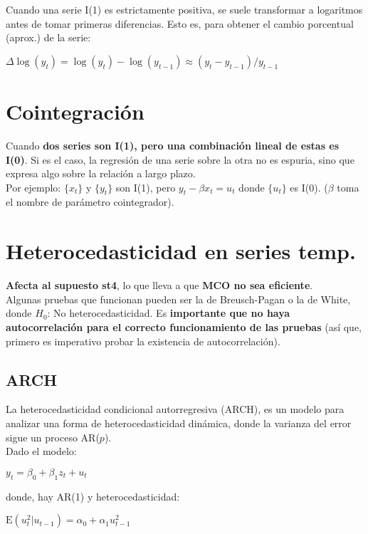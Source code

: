 \documentclass[10pt, a4paper, landscape]{extarticle}
\newcommand{\E}{\mathrm{E}}
\begin{document}
\begin{multicols}{3}
\begin{multicols}{2}
		\end{multicols}
		Cuando una serie I(1) es estrictamente positiva, se suele transformar a logaritmos antes de tomar primeras diferencias. Esto es, para obtener el cambio porcentual (aprox.) de la serie:
		\begin{center}
			$\Delta \log(y_t) = \log(y_t) - \log(y_{t-1}) \approx (y_t - y_{t-1}) / y_{t-1}$
		\end{center}
\columnbreak
\section*{Cointegración}
	Cuando \textbf{dos series son I(1), pero una combinación lineal de estas es I(0)}. Si es el caso, la regresión de una serie sobre la otra no es espuria, sino que expresa algo sobre la relación a largo plazo. \\
	Por ejemplo: $\lbrace x_t \rbrace$ y $\lbrace y_t \rbrace$ son I(1), pero $y_t - \beta x_t = u_t$ donde $\lbrace u_t \rbrace$ es I(0). ($\beta$ toma el nombre de parámetro cointegrador).

\section*{Heterocedasticidad en series temp.}
	\textbf{Afecta al supuesto st4}, lo que lleva a que \textbf{MCO no sea eficiente}. \\
	Algunas pruebas que funcionan pueden ser la de Breusch-Pagan o la de White, donde $H_0$: No heterocedasticidad. Es \textbf{importante que no haya autocorrelación para el correcto funcionamiento de las pruebas} (así que, primero es imperativo probar la existencia de autocorrelación).
	\subsection*{ARCH}
		La heterocedasticidad condicional autorregresiva (ARCH), es un modelo para analizar una forma de heterocedasticidad dinámica, donde la varianza del error sigue un proceso AR($p$). \\
		Dado el modelo:
		\begin{center}
			$y_t = \beta_0 + \beta_1 z_t + u_t$
		\end{center}
		donde, hay AR(1) y heterocedasticidad:
		\begin{center}
			$\E(u^2_t | u_{t-1}) = \alpha_0 + \alpha_1 u^2_{t-1}$
		\end{center}

\end{multicols}
\end{document}

